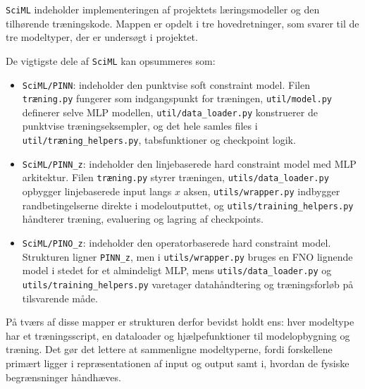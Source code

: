 \texttt{SciML} indeholder implementeringen af projektets læringsmodeller og den tilhørende træningskode. Mappen er opdelt i tre hovedretninger, som svarer til de tre modeltyper, der er undersøgt i projektet.

De vigtigste dele af \texttt{SciML} kan opsummeres som:
\begin{itemize}
    \item \texttt{SciML/PINN}: indeholder den punktvise soft constraint model. Filen \texttt{træning.py} fungerer som indgangspunkt for træningen, \texttt{util/model.py} definerer selve MLP modellen, \texttt{util/data\_loader.py} konstruerer de punktvise træningseksempler, og det hele  samles files i \texttt{util/træning\_helpers.py}, tabsfunktioner og checkpoint logik.
    \item \texttt{SciML/PINN\_z}: indeholder den linjebaserede hard constraint model med MLP arkitektur. Filen \texttt{træning.py} styrer træningen, \texttt{utils/data\_loader.py} opbygger linjebaserede input langs \(x\) aksen, \texttt{utils/wrapper.py} indbygger randbetingelserne direkte i modeloutputtet, og \texttt{utils/training\_helpers.py} håndterer træning, evaluering og lagring af checkpoints.
    \item \texttt{SciML/PINO\_z}: indeholder den operatorbaserede hard constraint model. Strukturen ligner \texttt{PINN\_z}, men i \texttt{utils/wrapper.py} bruges en FNO lignende model i stedet for et almindeligt MLP, mens \texttt{utils/data\_loader.py} og \texttt{utils/training\_helpers.py} varetager datahåndtering og træningsforløb på tilsvarende måde.
\end{itemize}

På tværs af disse mapper er strukturen derfor bevidst holdt ens: hver modeltype har et træningsscript, en dataloader og hjælpefunktioner til modelopbygning og træning. Det gør det lettere at sammenligne modeltyperne, fordi forskellene primært ligger i repræsentationen af input og output samt i, hvordan de fysiske begrænsninger håndhæves.
